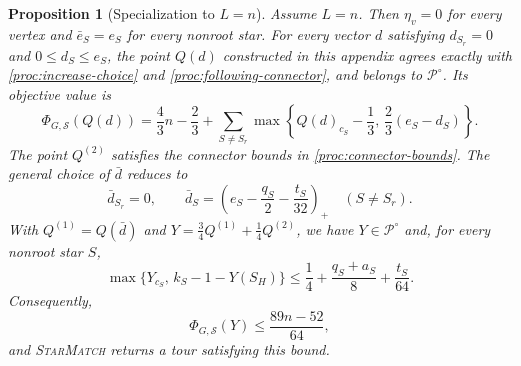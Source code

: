 \documentclass[11pt]{amsart}
\newcommand{\1}{\mathbbm{1}}
\newcommand{\ALG}{\textsc{StarMatch}}
\newtheorem{proposition}[theorem]{Proposition}
\begin{document}
\begin{proposition}[{Specialization to $L=n$}]
\label{prop:value-n-specialization}
{Assume $L=n$. Then $\eta_v=0$ for every vertex
and $\bar e_S=e_S$ for every nonroot star. For every vector
$d$ satisfying $d_{S_r}=0$ and $0\le d_S\le e_S$,
the point $Q(d)$ constructed in this appendix agrees exactly
with \eqref{proc:increase-choice} and
\eqref{proc:following-connector}, and belongs to
$\mathcal P^\circ$. Its objective value is
\begin{equation}\label{eq:value-n-objective}
 \Phi_{G,\mathcal S}(Q(d))
 =\frac43n-\frac23+
 \sum_{S\ne S_r}\max\left\{
 Q(d)_{c_S}-\frac13,\,\frac23(e_S-d_S)\right\}.
\end{equation}
The point $Q^{(2)}$ satisfies the connector bounds in
\eqref{proc:connector-bounds}. The general choice of $\bar d$
reduces to
\[
 \bar d_{S_r}=0,\qquad
 \bar d_S=\left(e_S-\frac{q_S}{2}-\frac{t_S}{32}\right)_+
 \quad(S\ne S_r).
\]
With $Q^{(1)}=Q(\bar d)$ and
$Y=\frac34Q^{(1)}+\frac14Q^{(2)}$, we have
$Y\in\mathcal P^\circ$ and, for every nonroot star $S$,
\begin{equation}\label{eq:value-n-local}
 \max\{Y_{c_S},\,k_S-1-Y(S_H)\}
 \le\frac14+\frac{q_S+a_S}{8}+\frac{t_S}{64}.
\end{equation}
Consequently,
\begin{equation}\label{eq:value-n-bound}
 \Phi_{G,\mathcal S}(Y)\le\frac{89n-52}{64},
\end{equation}
and \ALG{} returns a tour satisfying this bound.}
\end{proposition}
\end{document}
